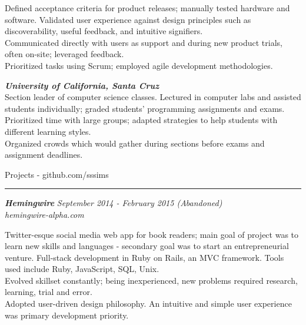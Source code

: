 \documentclass[10pt]{article}
\newcommand{\simsbullet}{{\raisebox{2pt}{\tiny $\bullet$}}\hspace{8pt}}
\begin{document}
Defined acceptance criteria for product releases; manually tested hardware and software.
\vskip 4pt
\simsbullet Validated user experience against design principles such as discoverability, useful feedback, and intuitive signifiers. \\
\simsbullet Communicated directly with users as support and during new product trials, often on-site; leveraged feedback. \\
\simsbullet Prioritized tasks using Scrum; employed agile development methodologies.

\setlength{\leftskip}{0pt}

\vskip 12pt

{\bfseries\itshape\sffamily University of California, Santa Cruz} \hfill {\itshape{}} \\
{\itshape{}}
\vskip 4pt
\setlength{\leftskip}{16pt}
Section leader of computer science classes. Lectured in computer labs and assisted students individually; graded students' programming assignments and exams. 
\vskip 4pt
\simsbullet Prioritized time with large groups; adapted strategies to help students with different learning styles. \\
\simsbullet Organized crowds which would gather during sections before exams and assignment deadlines. 

\setlength{\leftskip}{0pt}

\vskip 14pt


{\Large\sffamily Projects {\small - github.com/sssims}}
\vskip 1pt
\hrule
\vskip 6pt
{\bfseries\itshape\sffamily Hemingwire} \hfill \textsf{\textit{September 2014 - February 2015 (Abandoned)}}\\
\textit{\textsf{hemingwire-alpha.com}} 

\setlength{\leftskip}{16pt}

Twitter-esque social media web app for book readers; main goal of project was to learn new skills and languages - secondary goal was to start an entrepreneurial venture. 
\vskip 4pt
\simsbullet Full-stack development in Ruby on Rails, an MVC framework. Tools used include Ruby, JavaScript, SQL, Unix.\\
\simsbullet Evolved skillset constantly; being inexperienced, new problems required research, learning, trial and error.\\
\simsbullet Adopted user-driven design philosophy. An intuitive and simple user experience was primary development priority.
\end{document}
